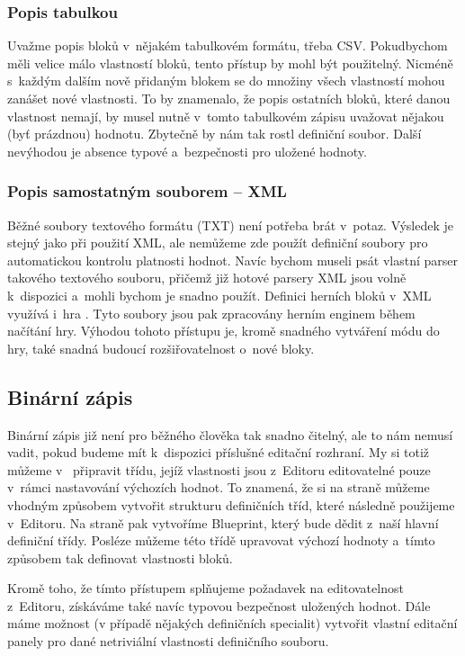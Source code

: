 \subsubsection{Popis tabulkou}
Uvažme popis bloků v~nějakém tabulkovém formátu, třeba CSV. Pokud\linebreak bychom měli velice málo vlastností bloků, tento přístup by mohl být použitelný. Nicméně s~každým dalším nově přidaným blokem se do množiny všech vlastností mohou zanášet nové vlastnosti. To by znamenalo, že popis ostatních bloků, které danou vlastnost nemají, by musel nutně v~tomto tabulkovém zápisu uvažovat nějakou (byť prázdnou) hodnotu. Zbytečně by nám tak rostl definiční soubor. Další nevýhodou je absence typové a~bezpečnosti pro uložené hodnoty. 

\subsubsection{Popis samostatným souborem -- XML}
Běžné soubory textového formátu (TXT) není potřeba brát v~potaz. Výsledek je stejný jako při použití XML, ale nemůžeme zde použít definiční soubory pro automatickou kontrolu platnosti hodnot. Navíc bychom museli psát vlastní parser takového textového souboru, přičemž již hotové parsery XML jsou volně k~dispozici a~mohli bychom je snadno použít. Definici herních bloků v~XML využívá i~hra \ME{}. Tyto soubory jsou pak zpracovány herním enginem během načítání hry. Výhodou tohoto přístupu je, kromě snadného vytváření módu do hry, také snadná budoucí rozšiřovatelnost o~nové bloky.

\subsection{Binární zápis}
Binární zápis již není pro běžného člověka tak snadno čitelný, ale to nám nemusí vadit, pokud budeme mít k~dispozici příslušné editační rozhraní. My si totiž můžeme v~\UEu{} připravit třídu, jejíž vlastnosti jsou z~Editoru editovatelné pouze v~rámci nastavování výchozích hodnot. To znamená, že si na straně \CPP{} můžeme vhodným způsobem vytvořit strukturu definičních tříd, které následně použijeme v~Editoru. Na straně \UEu{} pak vytvoříme Blueprint, který bude dědit z~naší hlavní definiční třídy. Posléze můžeme této třídě upravovat výchozí hodnoty a~tímto způsobem tak definovat vlastnosti bloků.

Kromě toho, že tímto přístupem splňujeme požadavek na editovatelnost z~Editoru, získáváme také navíc typovou bezpečnost uložených hodnot. Dále máme možnost (v případě nějakých definičních specialit) vytvořit vlastní editační panely pro dané netriviální vlastnosti definičního souboru. 



